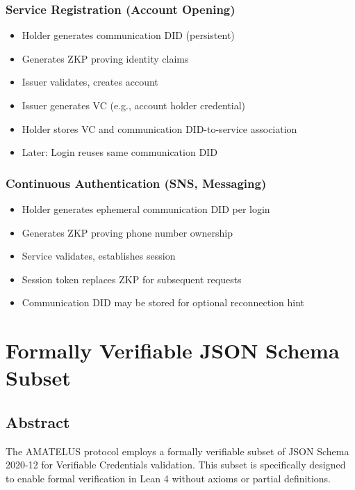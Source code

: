 \subsection{Service Registration (Account Opening)}

\begin{itemize}
  \item Holder generates communication DID (persistent)
  \item Generates ZKP proving identity claims
  \item Issuer validates, creates account
  \item Issuer generates VC (e.g., account holder credential)
  \item Holder stores VC and communication DID-to-service association
  \item Later: Login reuses same communication DID
\end{itemize}

\subsection{Continuous Authentication (SNS, Messaging)}

\begin{itemize}
  \item Holder generates ephemeral communication DID per login
  \item Generates ZKP proving phone number ownership
  \item Service validates, establishes session
  \item Session token replaces ZKP for subsequent requests
  \item Communication DID may be stored for optional reconnection hint
\end{itemize}

\chapter{Formally Verifiable JSON Schema Subset}

\section{Abstract}

The AMATELUS protocol employs a formally verifiable subset of JSON Schema 2020-12 for Verifiable Credentials validation. This subset is specifically designed to enable formal verification in Lean 4 without axioms or partial definitions.

